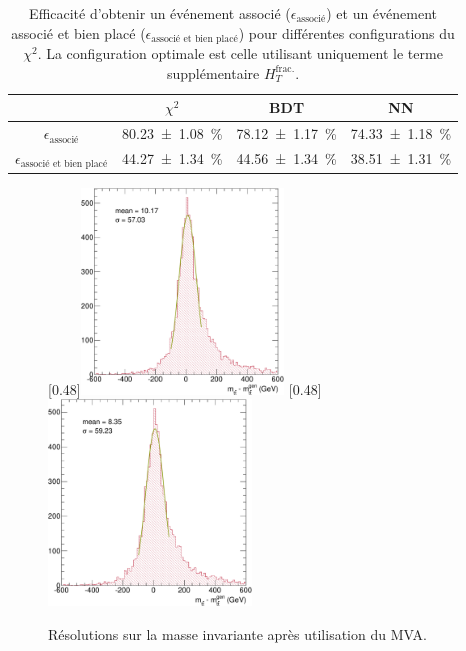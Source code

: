 \begin{table}[tbp] \centering
    \begin{tabular}{@{}cccc@{}} \toprule
        & $\chi^2$ & BDT & NN \\ \midrule
        $\epsilon_\text{associé}$ & \SI{80.23 \pm 1.08}{\%} & \SI{78.12 \pm 1.17}{\%} & \SI{74.33 \pm 1.18}{\%} \\
        $\epsilon_\text{associé et bien placé}$ & \SI{44.27 \pm 1.34}{\%} & \SI{44.56 \pm 1.34}{\%} & \SI{38.51 \pm 1.31}{\%} \\ \bottomrule
    \end{tabular}
    \caption{Efficacité d'obtenir un événement associé ($\epsilon_\text{associé}$) et un événement associé et bien placé ($\epsilon_\text{associé et bien placé}$) pour différentes configurations du $\chi^2$. La configuration optimale est celle utilisant uniquement le terme supplémentaire $H_{T}^{\text{frac.}}$.}
    \label{tab:chi2_vs_bdt_vs_nn}
\end{table}

\begin{figure}[tbp] \centering
    [0.48\textwidth]{\includegraphics[width=0.48\textwidth]{chapitre6/figs/mtt_resolution_bdt.pdf}}
    [0.48\textwidth]{\includegraphics[width=0.48\textwidth]{chapitre6/figs/mtt_resolution_NN.pdf}}
    \caption{Résolutions sur la masse invariante \ttbar après utilisation du MVA.}
    \label{fig:mtt_res_mva}
\end{figure}

